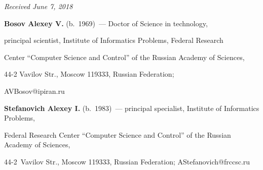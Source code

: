 \vspace*{-6pt}





\hfill{\small\textit{Received June 7, 2018}}












     


     \Contr


     


\noindent


\textbf{Bosov Alexey V.} (b.\ 1969)~--- Doctor of Science in technology, 


principal scientist, Institute of Informatics Problems, Federal Research 


Center ``Computer Science and Control'' of the Russian Academy of Sciences, 


44-2 Vavilov Str., Moscow 119333, Russian Federation; 


\mbox{AVBosov@ipiran.ru}





\vspace*{3pt}





\noindent


\textbf{Stefanovich Alexey I.} (b.\ 1983)~--- principal specialist, Institute of Informatics Problems, 


Federal Research Center ``Computer Science and Control'' of the Russian Academy of Sciences,  


44-2~Vavilov Str., Moscow 119333, Russian Federation; \mbox{AStefanovich@frccsc.ru}


\label{end\stat}





\renewcommand{\bibname}{\protect\rm Литература}       





      


